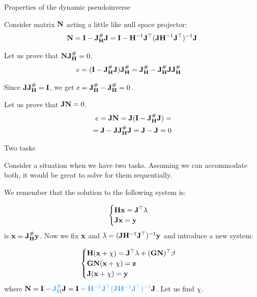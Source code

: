 \documentclass{beamer}
\newcommand{\iH} {\mathbf{H}^{-1}}
\newcommand{\JH} {\bo{J}^\#_\bo{H}}
\begin{document}
\begin{frame}{Properties of the dynamic pseudoinverse}
	\begin{flushleft}
		
		Consider matrix $\mathbf{N}$ acting a little like null space projector:
		\begin{align}
			\bo{N} = \bo{I} - \JH \bo{J} 
			= \bo{I} - \iH \bo{J}\T (\bo{J} \iH \bo{J}\T)^{-1} \bo{J}
		\end{align}
		
		Let us prove that $\bo{N}\JH = 0$.
		\begin{align}
			e &= (\bo{I} - \JH \bo{J}) \JH 
			= \JH - \JH \bo{J}\JH
		\end{align}
		
		Since $\bo{J} \JH = \bo{I}$, we get $e = \JH - \JH = 0$.
		
		\bigskip
		
		Let us prove that $\mathbf{J} \mathbf{N} = 0$.
		\begin{align}
			e = \bo{J} \bo{N}
			= \bo{J} (\bo{I} - \JH \bo{J}) =\\
			 = \bo{J} - \bo{J} \JH \bo{J} 
			= \bo{J} - \bo{J} = 0
		\end{align}
		
	\end{flushleft}
\end{frame}




\begin{frame}{Two tasks}
	\begin{flushleft}
		
		Consider a situation when we have two tasks. Assuming we can accommodate both, it would be great to solve for them sequentially.
		
		We remember that the solution to the following system is:
		
		\begin{equation}
			\begin{cases}
				\mathbf{H} \mathbf{x} = \mathbf{J}^\top \lambda \\
				\mathbf{J} \mathbf{x} = \mathbf{y}
			\end{cases}
		\end{equation}
		is $\bo{x} = \JH \bo{y}$.  Now we fix $\mathbf{x}$ and $\lambda = (\bo{J} \iH \bo{J}\T)^{-1} \bo{y}$ and introduce a new system:
		
		\begin{equation}
			\begin{cases}
				\mathbf{H} (\mathbf{x} + \chi) = \mathbf{J}^\top \lambda + (\mathbf{G}\mathbf{N})^\top \beta\\
				\mathbf{G}\mathbf{N} (\mathbf{x} + \chi) = \mathbf{z} \\
				\mathbf{J} (\mathbf{x} + \chi) = \mathbf{y}
			\end{cases}
		\end{equation}
		where $\bo{N} = \bo{I} - \textcolor{mydarkblue}{\JH} \bo{J} = \bo{I} - \textcolor{mydarkblue}{\iH \bo{J}\T (\bo{J} \iH \bo{J}\T)^{-1} }\bo{J}$. 		Let us find $\chi$. 
		
	\end{flushleft}
\end{frame}
\end{document}
